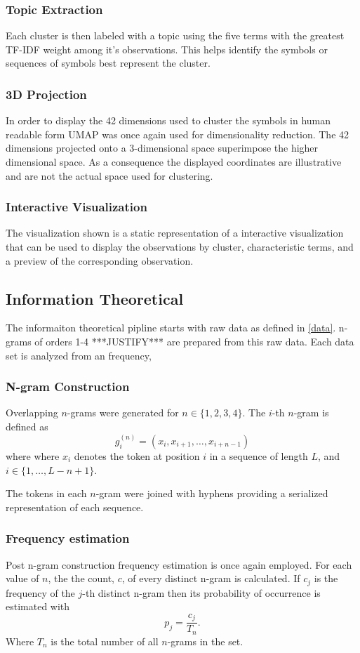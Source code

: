 \documentclass[preprint,12pt]{elsarticle}
\begin{document}
\subsubsection{Topic Extraction}
Each cluster is then labeled with a topic using the five terms with the greatest TF-IDF weight among it's observations. This helps identify the symbols or sequences of symbols best represent the cluster. 

\subsubsection{3D Projection}
In order to display the 42 dimensions used to cluster the symbols in human readable form UMAP was once again used for dimensionality reduction. The 42 dimensions projected onto a 3-dimensional space superimpose the higher dimensional space. As a consequence the displayed coordinates are illustrative and are not the actual space used for clustering.

\subsubsection{Interactive Visualization}
The visualization shown is a static representation of a interactive visualization that can be used to display the observations by cluster, characteristic terms, and a preview of the corresponding observation. 

\subsection{Information Theoretical}
The informaiton theoretical pipline starts with raw data as defined in \ref{data}. n-grams of orders 1-4 ***JUSTIFY*** are prepared from this raw data. Each data set is analyzed from an frequency, 

\subsubsection{N-gram Construction}
Overlapping \(n\)-grams were generated for \(n \in \{1,2,3,4\}\). The \(i\)-th \(n\)-gram is defined as
\[
g_i^{(n)} = (x_i,x_{i+1},\ldots,x_{i+n-1})
\]
where where \(x_i\) denotes the token at position \(i\) in a sequence of length \(L\), and \(i \in \{1,\ldots,L-n+1\}\).

The tokens in each \(n\)-gram were joined with hyphens providing a serialized representation of each sequence. 

\subsubsection{Frequency estimation}
Post n-gram construction frequency estimation is once again employed. For each value of \(n\), the the count, \(c\), of every distinct n-gram is calculated. If \(c_j\) is the frequency of the \(j\)-th distinct n-gram then its probability of occurrence is estimated with 
\[
p_j = \frac{c_j}{T_n}.
\]
Where \(T_n\) is the total number of all \(n\)-grams in the set.
\end{document}
